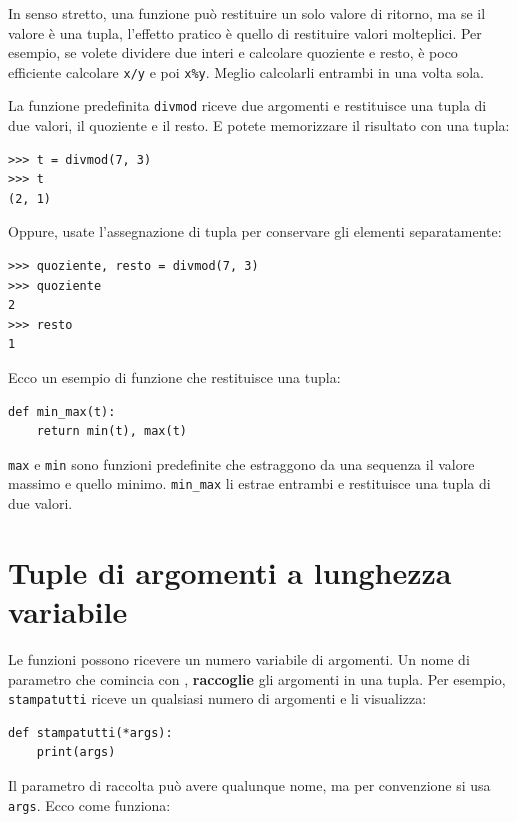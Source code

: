 \documentclass[10pt]{book}
\begin{document}
In senso stretto, una funzione può restituire un solo valore di ritorno, ma se il valore è una tupla, l'effetto pratico è quello di restituire valori molteplici. Per esempio, se volete dividere due interi e calcolare quoziente e resto, è poco efficiente calcolare {\tt x/y} e poi {\tt x\%y}.  Meglio calcolarli entrambi in una volta sola.

La funzione predefinita {\tt divmod} riceve due argomenti e restituisce una tupla di due valori, il quoziente e il resto. E potete memorizzare il risultato con una tupla:

\begin{verbatim}
>>> t = divmod(7, 3)
>>> t
(2, 1)
\end{verbatim}
%
Oppure, usate l'assegnazione di tupla per conservare gli elementi separatamente:

\begin{verbatim}
>>> quoziente, resto = divmod(7, 3)
>>> quoziente
2
>>> resto
1
\end{verbatim}
%
Ecco un esempio di funzione che restituisce una tupla:

\begin{verbatim}
def min_max(t):
    return min(t), max(t)
\end{verbatim}
%
{\tt max} e {\tt min} sono funzioni predefinite che estraggono da una sequenza il valore massimo e quello minimo.  \verb"min_max" li estrae entrambi e restituisce una tupla di due valori.


\section{Tuple di argomenti a lunghezza variabile}
\label{gather}

Le funzioni possono ricevere un numero variabile di argomenti. Un nome di parametro che comincia con {\tt *}, {\bf raccoglie} gli argomenti in una tupla. Per esempio, {\tt stampatutti} riceve un qualsiasi numero di argomenti e li visualizza:

\begin{verbatim}
def stampatutti(*args):
    print(args)
\end{verbatim}
%
Il parametro di raccolta può avere qualunque nome, ma per convenzione si usa {\tt args}. Ecco come funziona:
\end{document}
